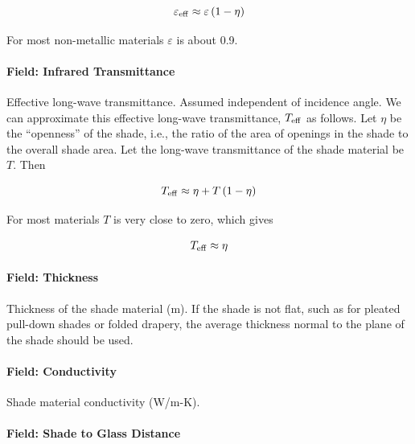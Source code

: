 \begin{equation}
{\varepsilon_{{\rm{eff}}}} \approx \varepsilon \left( {1 - \eta } \right)
\end{equation}

For most non-metallic materials \(\varepsilon\) is about 0.9.

\paragraph{Field: Infrared Transmittance}\label{field-infrared-transmittance}

Effective long-wave transmittance. Assumed independent of incidence angle. We can approximate this effective long-wave transmittance, \(T_{\rm{eff}}\) as follows. Let \(\eta\) be the ``openness'' of the shade, i.e., the ratio of the area of openings in the shade to the overall shade area. Let the long-wave transmittance of the shade material be \(T\). Then

\begin{equation}
T_{\rm{eff}} \approx \eta + T \left( 1 - \eta \right)
\end{equation}

For most materials \(T\) is very close to zero, which gives

\begin{equation}
T_{\rm{eff}} \approx \eta
\end{equation}

\paragraph{Field: Thickness}\label{field-thickness-6}

Thickness of the shade material (m). If the shade is not flat, such as for pleated pull-down shades or folded drapery, the average thickness normal to the plane of the shade should be used.

\paragraph{Field: Conductivity}\label{field-conductivity-3}

Shade material conductivity (W/m-K).

\paragraph{Field: Shade to Glass Distance}\label{field-shade-to-glass-distance}

